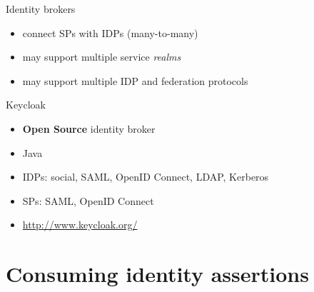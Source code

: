 \documentclass[ignorenonframetext,aspectratio=169]{beamer}
\providecommand{\tightlist}{%
  \setlength{\itemsep}{0pt}\setlength{\parskip}{0pt}}
\begin{document}
\begin{frame}{Identity brokers}

\begin{itemize}
\tightlist
\item
  connect SPs with IDPs (many-to-many)
\item
  may support multiple service \emph{realms}
\item
  may support multiple IDP and federation protocols
\end{itemize}

\end{frame}

\begin{frame}[plain]
\centering
{}
\end{frame}

\begin{frame}{Keycloak}

\begin{itemize}
\tightlist
\item
    {\bf Open Source} identity broker
\item
  Java
\item
  IDPs: social, SAML, OpenID Connect, LDAP, Kerberos
\item
  SPs: SAML, OpenID Connect
\item
  \url{http://www.keycloak.org/}
\end{itemize}

\end{frame}

\section{Consuming identity assertions}
\end{document}
